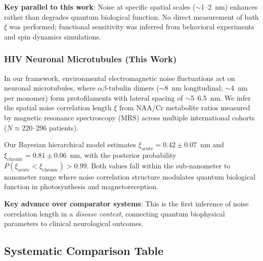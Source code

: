 \documentclass[11pt]{article}
\begin{document}
\textbf{Key parallel to this work}: Noise at specific spatial scales ($\sim$1--2~nm) enhances rather 
than degrades quantum biological function. No direct measurement of bath $\xi$ was performed; 
functional sensitivity was inferred from behavioral experiments and spin dynamics simulations.

\subsubsection{HIV Neuronal Microtubules (This Work)}

In our framework, environmental electromagnetic noise fluctuations act on neuronal microtubules, 
where $\alpha\beta$-tubulin dimers ($\sim$8~nm longitudinal; $\sim$4~nm per monomer) form 
protofilaments with lateral spacing of $\sim$5--6.5~nm. We infer the spatial noise correlation 
length $\xi$ from NAA/Cr metabolite ratios measured by magnetic resonance spectroscopy (MRS) across 
multiple international cohorts ($N \approx 220$--296 patients).

Our Bayesian hierarchical model estimates $\xi_\text{acute} = 0.42 \pm 0.07$~nm and 
$\xi_\text{chronic} = 0.81 \pm 0.06$~nm, with the posterior probability 
$P(\xi_\text{acute} < \xi_\text{chronic}) > 0.99$. Both values fall within the sub-nanometer to 
nanometer range where noise correlation structure modulates quantum biological function in 
photosynthesis and magnetoreception.

\textbf{Key advance over comparator systems}: This is the first inference of noise correlation 
length in a \textit{disease context}, connecting quantum biophysical parameters to clinical 
neurological outcomes.

\subsection{Systematic Comparison Table}
\end{document}
